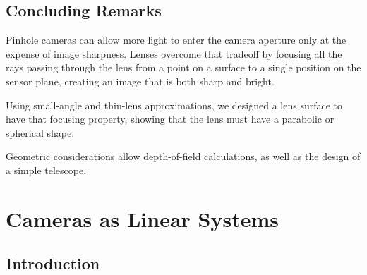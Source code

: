 

\section{Concluding Remarks}
Pinhole cameras can allow more light to enter the camera aperture only at the expense of image sharpness.  Lenses overcome that tradeoff by focusing all the rays passing through the lens from a point on a surface to a single position on the sensor plane, creating an image that is both sharp and bright.

Using small-angle and thin-lens approximations, we designed a lens surface to have that focusing property, showing that the lens must have a parabolic or spherical shape.

Geometric considerations allow depth-of-field calculations, as well as the design of a simple telescope.



\newcommand{\boldimgworld}{\boldsymbol\ell_{\texttt{w}}}
\newcommand{\boldimgsensor}{\boldsymbol\ell_{\texttt{s}}}
\newcommand{\boldimgground}{\boldsymbol\ell_{\texttt{ground}}}
\newcommand{\imgworld}{\ell_{\texttt{w}}}
\newcommand{\imgsensor}{\ell_{\texttt{s}}}


\chapter{Cameras as Linear Systems}
\label{chapter:cameras_as_linear_systems}




\section{Introduction}

